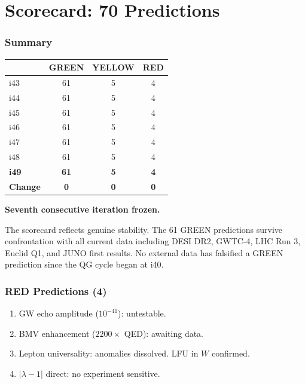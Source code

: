 \documentclass[11pt,a4paper]{article}
\newcommand{\GREEN}{\textcolor{dfdgreen}{\textbf{GREEN}}}
\newcommand{\YELLOW}{\textcolor{dfdyellow}{\textbf{YELLOW}}}
\newcommand{\RED}{\textcolor{dfdred}{\textbf{RED}}}
\begin{document}
\part{Scorecard: 70 Predictions}

\section{Summary}

\begin{center}
\begin{tabular}{lccc}
\toprule
& \textbf{\GREEN} & \textbf{\YELLOW} & \textbf{\RED} \\
\midrule
i43 & 61 & 5 & 4 \\
i44 & 61 & 5 & 4 \\
i45 & 61 & 5 & 4 \\
i46 & 61 & 5 & 4 \\
i47 & 61 & 5 & 4 \\
i48 & 61 & 5 & 4 \\
\textbf{i49} & \textbf{61} & \textbf{5} & \textbf{4} \\
\textbf{Change} & \textbf{0} & \textbf{0} & \textbf{0} \\
\bottomrule
\end{tabular}
\end{center}

\textbf{Seventh consecutive iteration frozen.}

The scorecard reflects genuine stability. The 61 GREEN predictions survive confrontation with all current data including DESI DR2, GWTC-4, LHC Run 3, Euclid Q1, and JUNO first results. No external data has falsified a GREEN prediction since the QG cycle began at i40.

\section{RED Predictions (4)}

\begin{enumerate}
\item GW echo amplitude ($10^{-41}$): untestable.
\item BMV enhancement ($2200\times$ QED): awaiting data.
\item Lepton universality: anomalies dissolved. LFU in $W$ confirmed.
\item $|\lambda-1|$ direct: no experiment sensitive.
\end{enumerate}
\end{document}
